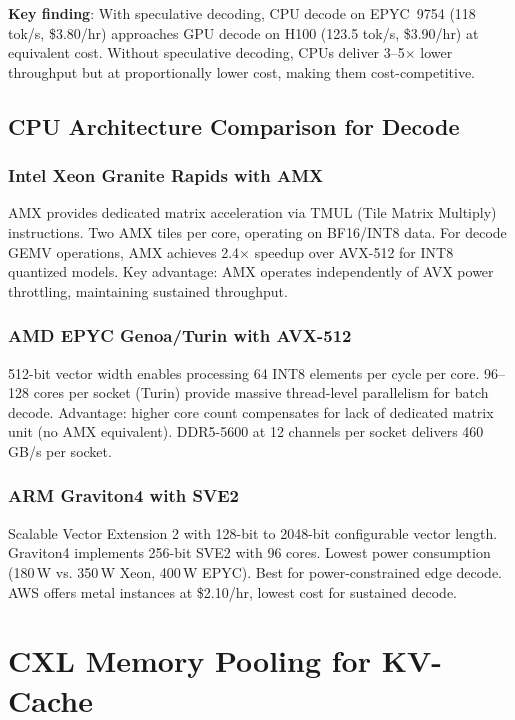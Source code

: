 \documentclass[conference,10pt]{IEEEtran}
\begin{document}
\textbf{Key finding}: With speculative decoding, CPU decode on EPYC~9754 (118 tok/s, \$3.80/hr) approaches GPU decode on H100 (123.5 tok/s, \$3.90/hr) at equivalent cost. Without speculative decoding, CPUs deliver 3--5$\times$ lower throughput but at proportionally lower cost, making them cost-competitive.

\subsection{CPU Architecture Comparison for Decode}

\subsubsection{Intel Xeon Granite Rapids with AMX}

AMX provides dedicated matrix acceleration via TMUL (Tile Matrix Multiply) instructions. Two AMX tiles per core, operating on BF16/INT8 data. For decode GEMV operations, AMX achieves 2.4$\times$ speedup over AVX-512 for INT8 quantized models. Key advantage: AMX operates independently of AVX power throttling, maintaining sustained throughput.

\subsubsection{AMD EPYC Genoa/Turin with AVX-512}

512-bit vector width enables processing 64 INT8 elements per cycle per core. 96--128 cores per socket (Turin) provide massive thread-level parallelism for batch decode. Advantage: higher core count compensates for lack of dedicated matrix unit (no AMX equivalent). DDR5-5600 at 12 channels per socket delivers 460\,GB/s per socket.

\subsubsection{ARM Graviton4 with SVE2}

Scalable Vector Extension 2 with 128-bit to 2048-bit configurable vector length. Graviton4 implements 256-bit SVE2 with 96 cores. Lowest power consumption (180\,W vs. 350\,W Xeon, 400\,W EPYC). Best for power-constrained edge decode. AWS offers metal instances at \$2.10/hr, lowest cost for sustained decode.


\section{CXL Memory Pooling for KV-Cache}
\label{sec:cxl}
\end{document}
